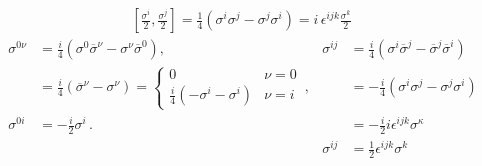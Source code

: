 \begin{align*}
  \left[\frac{\sigma^i}{2},\frac{\sigma^j}{2} \right]
 = \frac{1}{4}\left( \sigma^{i} \sigma^{j}-\sigma^{j} \sigma^{i}  \right)
=  i\,\epsilon^{ijk}\frac{\sigma^k}{2}
\
\end{align*}
\begin{align}
  \label{eq:sigijsi}
\sigma^{0\nu} &=\frac{i}{4}\left(\sigma^{0} \overline{\sigma}^{\nu}-\sigma^{\nu} \overline{\sigma}^{0}\right),                                         &\sigma^{ij} &=\frac{i}{4}\left(\sigma^{i} \overline{\sigma}^{j}-\overline{\sigma}^{j} \overline{\sigma}^{i}\right) \nonumber\\
              &=\frac{i}{4}\left(\overline{\sigma}^{\nu}-\sigma^{\nu}\right)=\begin{cases}0 & \nu=0\\\frac{i}{4}(-\sigma^i-\sigma^i) & \nu=i\end{cases}\,,&&=-\frac{i}{4}\left(\sigma^{i} \sigma^{j}-\sigma^{j} \sigma^{i}\right) \nonumber\\
      \sigma^{0i}  &=-\frac{i}{2} \sigma^{i}\,.                                                                                                            &&=-\frac{i}{2} i \epsilon^{i j k} \sigma^{\kappa}\\                                                                 
              &                                                                                                                                  &\sigma^{ij}&=\frac{1}{2} \epsilon^{i j k} \sigma^{k}                                          
\end{align}

